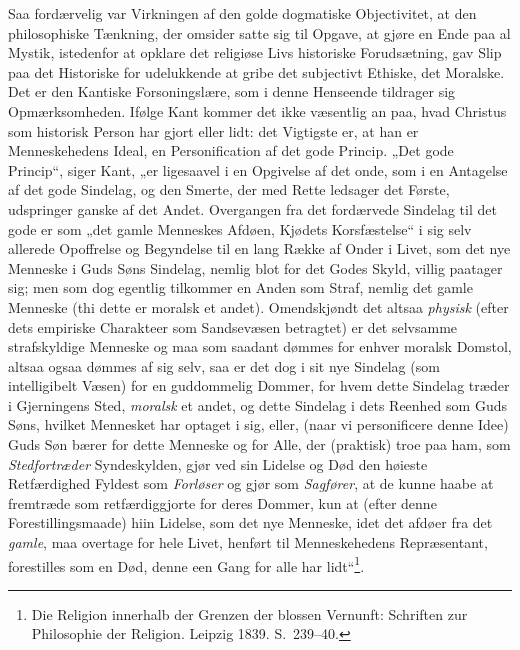 \documentclass[12pt]{book}
\begin{document}
Saa fordærvelig var Virkningen af den golde dogmatiske Objectivitet,
at den philosophiske Tænkning, der omsider satte sig til Opgave, at
gjøre en Ende paa al Mystik, istedenfor at opklare det religiøse
Livs historiske Forudsætning, gav Slip paa det Historiske for
udelukkende at gribe det subjectivt Ethiske, det Moralske. Det er
den Kantiske Forsoningslære, som i denne Henseende tildrager sig
Opmærksomheden. Ifølge Kant kommer det ikke væsentlig an paa, hvad
Christus som historisk Person har gjort eller lidt: det Vigtigste
er, at han er Menneskehedens Ideal, en Personification af det gode
Princip. „Det gode Princip“, siger Kant, „er ligesaavel i en
Opgivelse af det onde, som i en Antagelse af det gode Sindelag, og
den Smerte, der med Rette ledsager det Første, udspringer ganske af
det Andet. Overgangen fra det fordærvede Sindelag til det gode er
som „det gamle Menneskes Afdøen, Kjødets Korsfæstelse“ i sig selv
allerede Opoffrelse og Begyndelse til en lang Række af Onder i
Livet, som det nye Menneske i Guds Søns Sindelag, nemlig blot for
det Godes Skyld, villig paatager sig; men som dog egentlig tilkommer
en Anden som Straf, nemlig det gamle
Menneske (thi dette er moralsk et andet). Omendskjøndt det altsaa
\emph{physisk} (efter dets empiriske Charakteer som Sandsevæsen
betragtet) er det selvsamme strafskyldige Menneske og maa som
saadant dømmes for enhver moralsk Domstol, altsaa ogsaa dømmes af
sig selv, saa er det dog i sit nye Sindelag (som intelligibelt
Væsen) for en guddommelig Dommer, for hvem dette Sindelag træder i
Gjerningens Sted, \emph{moralsk} et andet, og dette Sindelag i dets
Reenhed som Guds Søns, hvilket Mennesket har optaget i sig, eller,
(naar vi personificere denne Idee) Guds Søn bærer for dette Menneske
og for Alle, der (praktisk) troe paa ham, som \emph{Stedfortræder}
Syndeskylden, gjør ved sin Lidelse og Død den høieste Retfærdighed
Fyldest som \emph{Forløser} og gjør som \emph{Sagfører}, at de kunne
haabe at fremtræde som retfærdiggjorte for deres Dommer, kun at
(efter denne Forestillingsmaade) hiin Lidelse, som det nye Menneske,
idet det afdøer fra det \emph{gamle}, maa overtage for hele Livet,
henført til Menneskehedens Repræsentant, forestilles som en Død,
denne een Gang for alle har lidt“\footnote{Die Religion innerhalb
der Grenzen der blossen Vernunft: Schriften zur Philosophie der
Religion. Leipzig 1839. S.\ 239--40.}.
\end{document}
